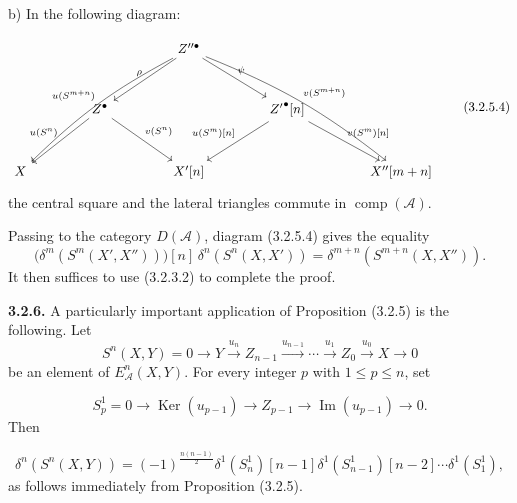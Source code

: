 \clearpage
{}%
\begingroup\small\setlength{\parskip}{0pt}\setlength{\emergencystretch}{1.5em}
\setlength{\abovedisplayskip}{4pt plus 2pt minus 2pt}%
\setlength{\belowdisplayskip}{4pt plus 2pt minus 2pt}%

\noindent b) In the following diagram:

\begin{equation}
\resizebox{0.96\textwidth}{!}{%
$\begin{tikzcd}[ampersand replacement=\&,column sep=4.1em,row sep=3.0em]
\&\& Z''^\bullet
  \arrow[ddll,bend right=8,"{u(S^{m+n})}"']
  \arrow[dl,"\rho"']
  \arrow[dr,"\psi"]
  \arrow[ddrr,bend left=8,"{v(S^{m+n})}"]
\&\& \\
\& Z^\bullet
  \arrow[dl,"{u(S^n)}"']
  \arrow[dr,"{v(S^n)}"]
\&\& {Z'}^\bullet[n]
  \arrow[dl,"{u(S^m)[n]}"']
  \arrow[dr,"{v(S^m)[n]}"]
\& \\
X \&\& X'[n] \&\& X''[m+n]
\end{tikzcd}$%
}
\tag{3.2.5.4}
\end{equation}
the central square and the lateral triangles commute in
$\operatorname{comp}(\mathcal A)$.

Passing to the category $D(\mathcal A)$, diagram (3.2.5.4) gives the
equality
\[
\bigl(\delta^m(S^m(X',X''))\bigr)[n]\,
\delta^n(S^n(X,X'))
=\delta^{m+n}(S^{m+n}(X,X'')).
\]
It then suffices to use (3.2.3.2) to complete the proof.

\medskip\noindent\textbf{3.2.6.}\quad
A particularly important application of Proposition (3.2.5) is the
following. Let
\[
S^n(X,Y)=0\longrightarrow Y\xrightarrow{u_n}Z_{n-1}
\xrightarrow{u_{n-1}}\cdots\xrightarrow{u_1}Z_0
\xrightarrow{u_0}X\longrightarrow0
\]
be an element of $E_{\mathcal A}^{n}(X,Y)$. For every integer $p$ with
$1\leq p\leq n$, set

\begin{equation}
S_p^1=0\longrightarrow\operatorname{Ker}(u_{p-1})
\longrightarrow Z_{p-1}\longrightarrow\operatorname{Im}(u_{p-1})
\longrightarrow0.
\tag{3.2.6.1}
\end{equation}
Then

\begin{equation}
\delta^n(S^n(X,Y))=(-1)^{\frac{n(n-1)}2}
\delta^1(S_n^1)[n-1]\delta^1(S_{n-1}^1)[n-2]\cdots
\delta^1(S_1^1),
\tag{3.2.6.2}
\end{equation}
as follows immediately from Proposition (3.2.5).

